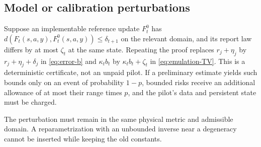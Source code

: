 \subsection{Model or calibration perturbations}
Suppose an implementable reference update $F_t^0$ has
$d(F_t(s,a,y),F_t^0(s,a,y))\le\delta_{t+1}$ on the relevant domain, and its
report law differs by at most $\zeta_t$ at the same state. Repeating the
proof replaces $r_j+\eta_j$ by $r_j+\eta_j+\delta_j$ in
\eqref{eq:error-b} and $\kappa_tb_t$ by $\kappa_tb_t+\zeta_t$ in
\eqref{eq:emulation-TV}. This is a deterministic certificate, not an
unpaid pilot. If a preliminary estimate yields such bounds only on an event
of probability $1-p$, bounded risks receive an additional allowance of at
most their range times $p$, and the pilot's data and persistent state must
be charged.

The perturbation must remain in the same physical metric and admissible
domain. A reparametrization with an unbounded inverse near a degeneracy
cannot be inserted while keeping the old constants.

